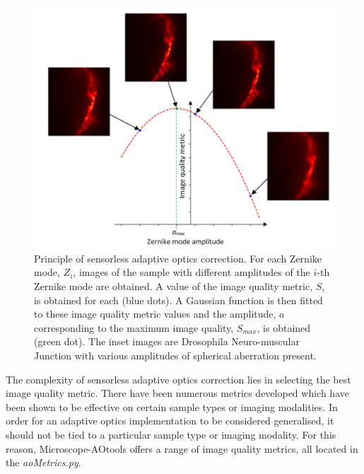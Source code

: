 \begin{figure}[h]
	\centering
	\includegraphics[width=1\textwidth,scale=0.5]{./images/sensorless_aberration_fitting_w_images.png}
	\caption{Principle of sensorless adaptive optics correction. For each Zernike mode, $Z_i$, images of the sample with different amplitudes of the $i$-th Zernike mode are obtained. A value of the image quality metric, $S$, is obtained for each (blue dots). A Gaussian function is then fitted to these image quality metric values and the amplitude, $a$ corresponding to the maximum image quality, $S_{max}$, is obtained (green dot). The inset images are Drosophila Neuro-muscular Junction with various amplitudes of spherical aberration present.}
	\label{fig:sensorless_correction_method}
\end{figure}

The complexity of sensorless adaptive optics correction lies in selecting the best image quality metric. There have been numerous metrics developed which have been shown to be effective on certain sample types or imaging modalities.\cite{burke2015adaptive,booth2002adaptive,fienup2003aberration,debarre2008adaptive} In order for an adaptive optics implementation to be considered generalised, it should not be tied to a particular sample type or imaging modality. For this reason, Microscope-AOtools offers a range of image quality metrics, all located in the \textit{aoMetrics.py}.  

